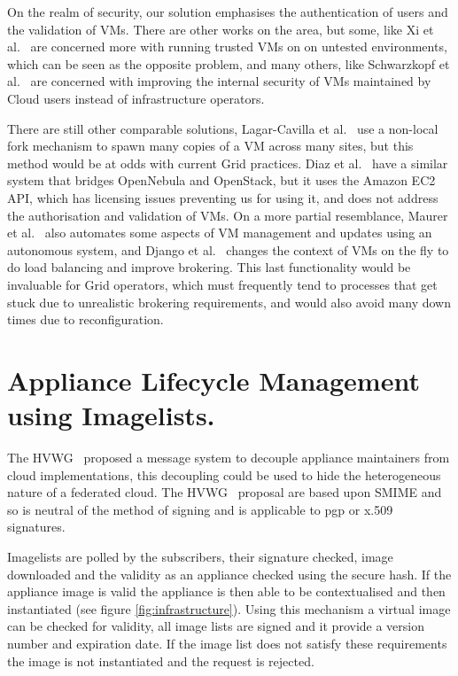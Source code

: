 \documentclass{llncs_Ibergrid2013}
\begin{document}
On the realm of security, our solution emphasises the authentication of users and the validation of VMs. There are other works on the area, but some, like Xi et al.~\cite{Xi2012} are concerned more with running trusted VMs on on untested environments, which can be seen as the opposite problem, and many others, like Schwarzkopf et al.~\cite{Schwarzkopf2012} are concerned with improving the internal security of VMs maintained by Cloud users instead of infrastructure operators.

There are still other comparable solutions, Lagar-Cavilla et al.~\cite{Lagar-Cavilla2009} use a non-local fork mechanism to spawn many copies of a VM across many sites, but this method would be at odds with current Grid practices. Diaz et al.~\cite{Diaz2012} have a similar system that bridges OpenNebula and OpenStack, but it uses the Amazon EC2 API, which has licensing issues preventing us for using it, and does not address the authorisation and validation of VMs. On a more partial resemblance, Maurer et al.~\cite{Maurer2013} also automates some aspects of VM management and updates using an autonomous system, and Django et al.~\cite{Django2013} changes the context of VMs on the fly to do load balancing and improve brokering. This last functionality would be invaluable for Grid operators, which must frequently tend to processes that get stuck due to unrealistic brokering requirements, and would also avoid many down times due to reconfiguration.

\section{Appliance Lifecycle Management using Imagelists.}
\label{sect-appliancelifecycle}
The HVWG~\cite{hepix} proposed a message system to decouple appliance maintainers from cloud implementations, this decoupling could be used to hide the heterogeneous nature of a federated cloud. The HVWG~\cite{hepix} proposal are based upon SMIME and so is neutral of the method of signing and is applicable to pgp or x.509 signatures.

Imagelists are polled by the subscribers, their signature checked, image downloaded and the validity as an appliance checked using the secure hash. If the appliance image is valid the appliance is then able to be contextualised and then instantiated (see figure \ref{fig:infrastructure}). 
Using this mechanism a virtual image can be checked for validity, all image lists are signed and it provide a version number and expiration date. If the image list does not satisfy these requirements the image is not instantiated and the request is rejected.
\end{document}

